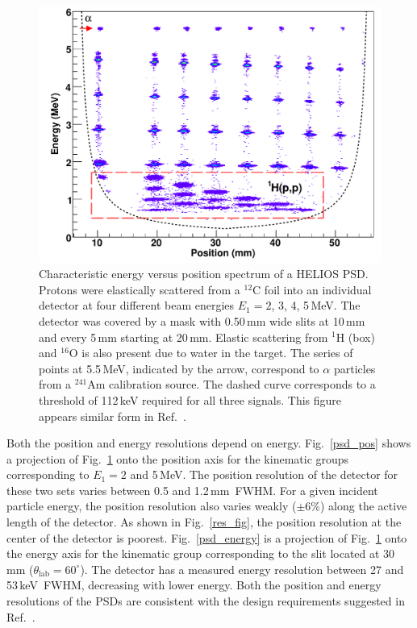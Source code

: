 \begin{figure}
\centering
\includegraphics[width=\linewidth]{Figures/out1}
\caption[Characteristic energy versus position spectrum of a HELIOS PSD]{Characteristic energy versus position spectrum of a HELIOS PSD.  Protons were elastically scattered from a $^{12}$C foil into an individual detector at four different beam energies $E_1=2$, 3, 4, 5\,MeV.  The detector was covered by a mask with 0.50\,mm wide slits at 10\,mm and every 5\,mm starting at 20\,mm.  Elastic scattering from $^1$H (box) and $^{16}$O is also present due to water in the target.  The series of points at 5.5\,MeV, indicated by the arrow, correspond to $\alpha$ particles from a $^{241}$Am calibration source.  The dashed curve corresponds to a threshold of 112\,keV required for all three signals. This figure appears similar form in Ref.~\cite{Lighthall_2010}.}
\label{psd_test}
\end{figure}

Both the position and energy resolutions depend on energy.  Fig.~\ref{psd_pos} shows a projection of Fig.~\ref{psd_test} onto the position axis for the kinematic groups corresponding to $E_1=2$ and 5\,MeV.  The position resolution of the detector for these two sets varies between 0.5 and 1.2\,mm~FWHM.  For a given incident particle energy, the position resolution also varies weakly ($\pm6$\%) along the active length of the detector.  As shown in Fig.~\ref{res_fig}, the %
 position resolution at the center of the detector is poorest.  Fig.~\ref{psd_energy} is a projection of Fig.~\ref{psd_test} onto the energy axis for the kinematic group corresponding to the  slit located at 30\,mm ($\theta_\mathrm{lab}=60^\circ$).  The detector has a measured energy resolution between 27 and 53\,keV~FWHM, decreasing with lower energy.  Both the position and energy resolutions of the PSDs are consistent with the design requirements suggested in Ref.~\cite{Wuosmaa_2007}.  

